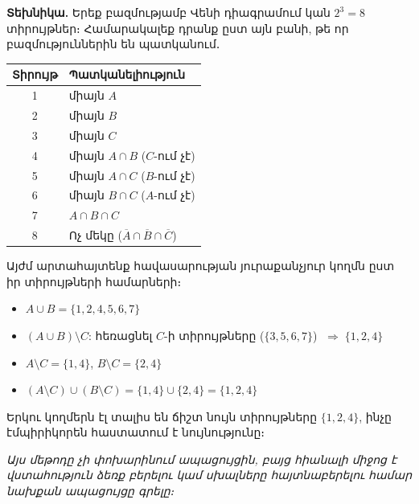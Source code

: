 \documentclass[12pt, a4paper]{article}
\newcommand{\comp}[1]{\overline{#1}}
\begin{document}
\medskip
\begin{tcolorbox}[colback=theoryBg, colframe=theoryFrame!80!black, arc=2mm, left=5pt, right=5pt, top=5pt, bottom=5pt, title={\small Տիրույթների համարակալման մեթոդ — Էմպիրիկ ստուգում}]
\textbf{Տեխնիկա.}\; Երեք բազմությամբ Վենի դիագրամում կան $2^3 = 8$ տիրույթներ։
Համարակալեք դրանք ըստ այն բանի, թե որ բազմություններին են պատկանում․

\begin{center}
\renewcommand{\arraystretch}{1.2}
\begin{tabular}{cl}
\toprule
\textbf{Տիրույթ} & \textbf{Պատկանելիություն} \\
\midrule
1 & միայն $A$ \\
2 & միայն $B$ \\
3 & միայն $C$ \\
4 & միայն $A \cap B$ ($C$-ում չէ) \\
5 & միայն $A \cap C$ ($B$-ում չէ) \\
6 & միայն $B \cap C$ ($A$-ում չէ) \\
7 & $A \cap B \cap C$ \\
8 & Ոչ մեկը ($\comp{A} \cap \comp{B} \cap \comp{C}$) \\
\bottomrule
\end{tabular}
\end{center}

Այժմ արտահայտենք հավասարության յուրաքանչյուր կողմն ըստ իր տիրույթների համարների։
\begin{itemize}[nosep]
  \item $A \cup B = \{1, 2, 4, 5, 6, 7\}$
  \item $(A \cup B) \setminus C$: հեռացնել $C$-ի տիրույթները ($\{3,5,6,7\}$)
        $\;\Longrightarrow\; \boxed{\{1, 2, 4\}}$
  \item $A \setminus C = \{1, 4\}$, \quad $B \setminus C = \{2, 4\}$
  \item $(A \setminus C) \cup (B \setminus C) = \{1, 4\} \cup \{2, 4\} = \boxed{\{1, 2, 4\}}$
\end{itemize}

Երկու կողմերն էլ տալիս են ճիշտ նույն տիրույթները $\{1, 2, 4\}$, ինչը էմպիրիկորեն հաստատում է նույնությունը։

\medskip
\textit{Այս մեթոդը չի փոխարինում ապացույցին, բայց հիանալի միջոց է վստահություն ձեռք բերելու կամ սխալները հայտնաբերելու համար նախքան ապացույցը գրելը։}
\end{tcolorbox}


\newpage
\end{document}

